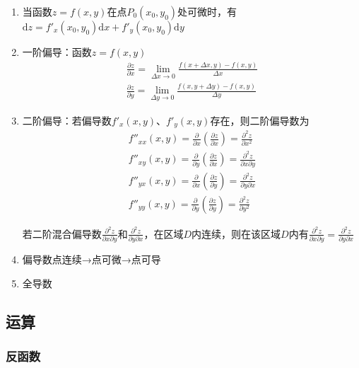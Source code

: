 \documentclass[12pt]{book}
\begin{document}
\begin{enumerate}[1.]
    \item 当函数$z=f(x,y) $在点$ P_0(x_0,y_0) $处可微时，有$ \mathrm{d}z=f'_x(x_0,y_0)\mathrm{d}x+f'_y(x_0,y_0)\mathrm{d}y$ 
    \item 一阶偏导：函数$ z=f(x,y) $
    \begin{gather*}
        \frac{\partial z}{\partial x} = \lim_{\Delta x\rightarrow 0}{\frac{f(x+\Delta x,y)-f(x,y)}{\Delta x}}\\ 
        \frac{\partial z}{\partial y} = \lim_{\Delta y\rightarrow 0}{\frac{f(x,y+\Delta y)-f(x,y)}{\Delta y}} 
    \end{gather*} 
    \item 二阶偏导：若偏导数$ f'_x(x,y) $、$ f'_y(x,y) $存在，则二阶偏导数为
    \begin{gather*}
        f''_{xx}(x,y)=\frac{\partial}{\partial x}(\frac{\partial z}{\partial x}) = \frac{\partial^2 z}{\partial{x}^2}\\ 
        f''_{xy}(x,y)=\frac{\partial}{\partial y}(\frac{\partial z}{\partial x}) = \frac{\partial^2 z}{\partial{x}\partial{y}}\\ 
        f''_{yx}(x,y)=\frac{\partial}{\partial x}(\frac{\partial z}{\partial y}) = \frac{\partial^2 z}{\partial{y}\partial{x}}\\ 
        f''_{yy}(x,y)=\frac{\partial}{\partial y}(\frac{\partial z}{\partial y}) = \frac{\partial^2 z}{\partial{y}^2} 
    \end{gather*}
    \par 若二阶混合偏导数$ \frac{\partial^2 z}{\partial{x}\partial{y}} $和$ \frac{\partial^2 z}{\partial{y}\partial{x}} $，在区域$ D $内连续，则在该区域$ D $内有$ \frac{\partial^2 z}{\partial{x}\partial{y}}=\frac{\partial^2 z}{\partial{y}\partial{x}} $
    \item 偏导数点连续→点可微→点可导
    \item 全导数
\end{enumerate}







\subsection{运算}

\subsubsection{反函数}
\end{document}

